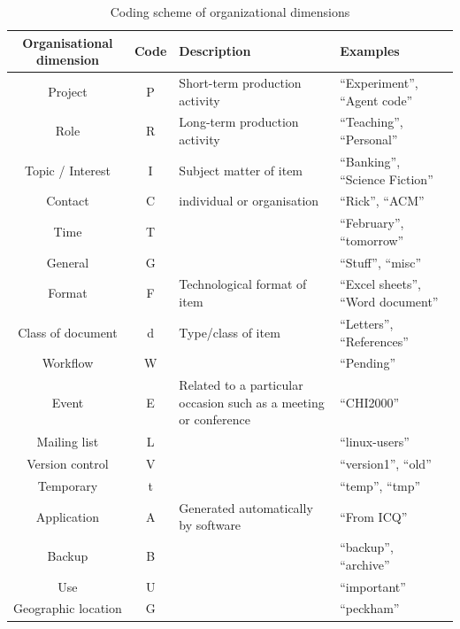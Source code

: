 \begin{table}[hbt]
\begin{center}
\begin{footnotesize}
\setlength{\extrarowheight}{2pt}
\begin{tabular}{|c|c|p{3cm}|p{3cm}|}
\hline
{\bf Organisational dimension} & {\bf Code} & {\bf Description} & {\bf Examples} \\
\hline
Project &          P & Short-term production activity & ``Experiment'', ``Agent code'' \\
\hline
Role &          R & Long-term production activity & ``Teaching'', ``Personal'' \\
\hline
Topic / Interest &          I & Subject matter of item & ``Banking'', ``Science Fiction'' \\
\hline
Contact &          C & individual or organisation & ``Rick'', ``ACM'' \\
\hline
Time &          T &  & ``February'', ``tomorrow'' \\
\hline
General &          G &  & ``Stuff'', ``misc'' \\
\hline
Format &          F & Technological format of item & ``Excel sheets'', ``Word document'' \\
\hline
Class of document &          d & Type/class of item & ``Letters'', ``References'' \\
\hline
Workflow &          W &            &  ``Pending'' \\
\hline
Event &          E & Related to a particular occasion such as a meeting or conference &  ``CHI2000'' \\
\hline
Mailing list &          L &            & ``linux-users'' \\
\hline
Version control &          V &            & ``version1'', ``old'' \\
\hline
 Temporary &          t &            & ``temp'', ``tmp'' \\
\hline
Application &          A & Generated automatically by software & ``From ICQ'' \\
\hline
Backup &          B  &            & ``backup'', ``archive'' \\
\hline
Use &          U  &            & ``important'' \\
\hline
Geographic location &          G  &            & ``peckham'' \\
\hline
\end{tabular}  
\end{footnotesize}
\caption{Coding scheme of organizational dimensions}
\label{table:exp-study:dimensions}
\end{center}
\end{table}

